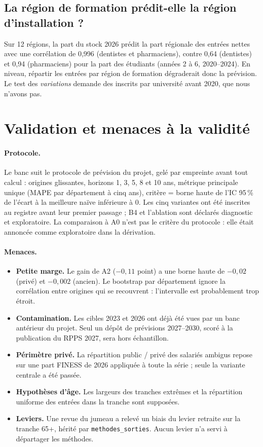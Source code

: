 \subsection{La région de formation prédit-elle la région d'installation ?}
Sur 12 régions, la part du stock 2026 prédit la part régionale des entrées nettes avec une
corrélation de 0,996\mesure{} (dentistes et pharmaciens), contre 0,64\mesure{} (dentistes) et
0,94\mesure{} (pharmaciens) pour la part des étudiants (années 2 à 6, 2020--2024). En niveau, répartir
les entrées par région de formation dégraderait donc la prévision. Le test des \emph{variations}
demande des inscrits par université avant 2020, que nous n'avons pas.

\section{Validation et menaces à la validité}
\paragraph{Protocole.} Le banc suit le protocole de prévision du projet, gelé par empreinte avant tout
calcul : origines glissantes, horizons 1, 3, 5, 8 et 10 ans, métrique principale unique (MAPE par
département à cinq ans), critère = borne haute de l'IC 95\,\% de l'écart à la meilleure naïve
inférieure à 0. Les cinq variantes ont été inscrites au registre avant leur premier passage ; B4 et
l'ablation sont déclarés diagnostic et exploratoire. La comparaison à A0 n'est pas le critère du
protocole : elle était annoncée comme exploratoire dans la dérivation.

\paragraph{Menaces.}
\begin{itemize}
  \item \textbf{Petite marge.} Le gain de A2 ($-0{,}11$ point) a une borne haute de $-0{,}02$ (privé)
        et $-0{,}002$ (ancien). Le bootstrap par département ignore la corrélation entre origines qui
        se recouvrent : l'intervalle est probablement trop étroit\suppose.
  \item \textbf{Contamination.} Les cibles 2023 et 2026 ont déjà été vues par un banc antérieur du
        projet. Seul un dépôt de prévisions 2027--2030, scoré à la publication du RPPS 2027, sera hors
        échantillon.
  \item \textbf{Périmètre privé.} La répartition public / privé des salariés ambigus repose sur une
        part FINESS de 2026 appliquée à toute la série ; seule la variante centrale a été passée.
  \item \textbf{Hypothèses d'âge.} Les largeurs des tranches extrêmes et la répartition uniforme des
        entrées dans la tranche sont supposées.
  \item \textbf{Leviers.} Une revue du jumeau a relevé un biais du levier retraite sur la tranche 65+,
        hérité par \texttt{methodes\_sorties}. Aucun levier n'a servi à départager les méthodes.
\end{itemize}

